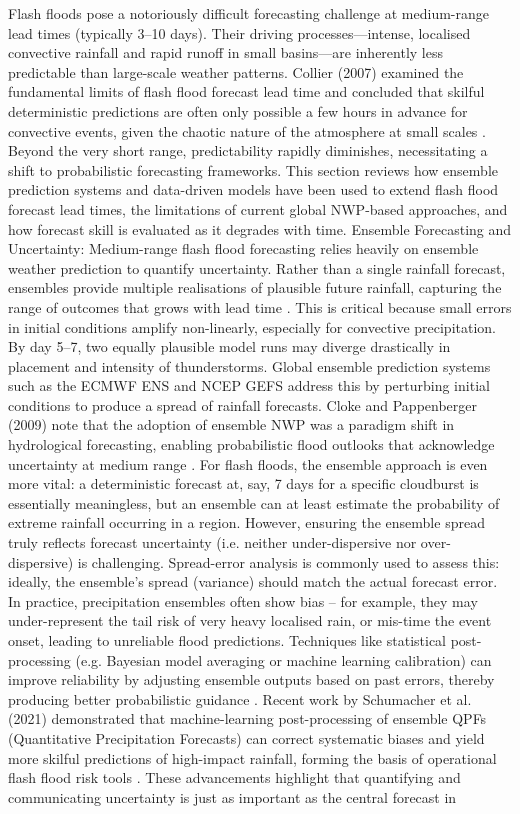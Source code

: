 Flash floods pose a notoriously difficult forecasting challenge at medium-range lead times (typically 3–10 days). Their driving processes—intense, localised convective rainfall and rapid runoff in small basins—are inherently less predictable than large-scale weather patterns. Collier (2007) examined the fundamental limits of flash flood forecast lead time and concluded that skilful deterministic predictions are often only possible a few hours in advance for convective events, given the chaotic nature of the atmosphere at small scales \citep{Collier2007}. Beyond the very short range, predictability rapidly diminishes, necessitating a shift to probabilistic forecasting frameworks. This section reviews how ensemble prediction systems and data-driven models have been used to extend flash flood forecast lead times, the limitations of current global NWP-based approaches, and how forecast skill is evaluated as it degrades with time. Ensemble Forecasting and Uncertainty: Medium-range flash flood forecasting relies heavily on ensemble weather prediction to quantify uncertainty. Rather than a single rainfall forecast, ensembles provide multiple realisations of plausible future rainfall, capturing the range of outcomes that grows with lead time \citep{Cloke2009}. This is critical because small errors in initial conditions amplify non-linearly, especially for convective precipitation. By day 5–7, two equally plausible model runs may diverge drastically in placement and intensity of thunderstorms. Global ensemble prediction systems such as the ECMWF ENS and NCEP GEFS address this by perturbing initial conditions to produce a spread of rainfall forecasts. Cloke and Pappenberger (2009) note that the adoption of ensemble NWP was a paradigm shift in hydrological forecasting, enabling probabilistic flood outlooks that acknowledge uncertainty at medium range \citep{Cloke2009}. For flash floods, the ensemble approach is even more vital: a deterministic forecast at, say, 7 days for a specific cloudburst is essentially meaningless, but an ensemble can at least estimate the probability of extreme rainfall occurring in a region. However, ensuring the ensemble spread truly reflects forecast uncertainty (i.e. neither under-dispersive nor over-dispersive) is challenging. Spread-error analysis is commonly used to assess this: ideally, the ensemble's spread (variance) should match the actual forecast error. In practice, precipitation ensembles often show bias – for example, they may under-represent the tail risk of very heavy localised rain, or mis-time the event onset, leading to unreliable flood predictions. Techniques like statistical post-processing (e.g. Bayesian model averaging or machine learning calibration) can improve reliability by adjusting ensemble outputs based on past errors, thereby producing better probabilistic guidance \citep{Schumacher2021}. Recent work by Schumacher et al. (2021) demonstrated that machine-learning post-processing of ensemble QPFs (Quantitative Precipitation Forecasts) can correct systematic biases and yield more skilful predictions of high-impact rainfall, forming the basis of operational flash flood risk tools \citep{Schumacher2021}. These advancements highlight that quantifying and communicating uncertainty is just as important as the central forecast in 